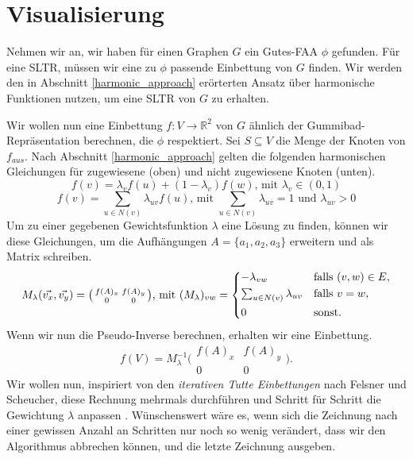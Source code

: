\section{Visualisierung}

Nehmen wir an, wir haben für einen Graphen $G$ ein Gutes-FAA $\phi$ gefunden. Für eine SLTR, müssen wir eine zu $\phi$ passende Einbettung von $G$ finden. Wir werden den in Abschnitt \ref{harmonic_approach} erörterten Ansatz über harmonische Funktionen nutzen, um eine SLTR von $G$ zu erhalten.

Wir wollen nun eine Einbettung $f:V\to \mathbb{R}^2$ von $G$ ähnlich der Gummibad-Repräsentation berechnen, die $\phi$ respektiert. Sei $S \subseteq V$ die Menge der Knoten von $f_{aus}$. Nach Abschnitt \ref{harmonic_approach} gelten die folgenden harmonischen Gleichungen für zugewiesene (oben) und nicht zugewiesene Knoten (unten).
$$ f(v) = \lambda_v f(u) + (1-\lambda_v)f(w) \text{, mit } \lambda_v \in (0,1) $$
$$ f(v) = \sum_{u \in N(v)} \lambda_{uv} f(u) \text{, mit }  \sum_{u \in N(v)}\lambda_{uv} = 1 \text{ und } \lambda_{uv} > 0 $$
Um zu einer gegebenen Gewichtsfunktion $\lambda$ eine Lösung zu finden, können wir diese Gleichungen, um die Aufhängungen $A = \{a_1,a_2,a_3\}$ erweitern und als Matrix schreiben.
\[ M_{\lambda}(\vec{v_x},\vec{v_y}) = \big( \begin{smallmatrix}f(A)_x&f(A)_y\\ 0&0\end{smallmatrix} \big) \text{, mit } (M_{\lambda})_{vw} =
	\begin{dcases}
	-\lambda_{vw} & \text{falls } (v,w) \in E, \\
	\textstyle\sum_{u \in N(v)} \lambda_{uv} & \text{falls } v = w, \\
	0 & \text{sonst.} \\
	\end{dcases}
\]
Wenn wir nun die Pseudo-Inverse berechnen, erhalten wir eine Einbettung.
$$f(V) = M_{\lambda}^{-1}\big( \begin{smallmatrix}f(A)_x&f(A)_y\\ 0&0\end{smallmatrix} \big).$$
Wir wollen nun, inspiriert von den \textit{iterativen Tutte Einbettungen} nach Felsner und Scheucher, diese Rechnung mehrmals durchführen und Schritt für Schritt die Gewichtung $\lambda$ anpassen \cite{fs17}. Wünschenswert wäre es, wenn sich die Zeichnung nach einer gewissen Anzahl an Schritten nur noch so wenig verändert, dass wir den Algorithmus abbrechen können, und die letzte Zeichnung ausgeben.

